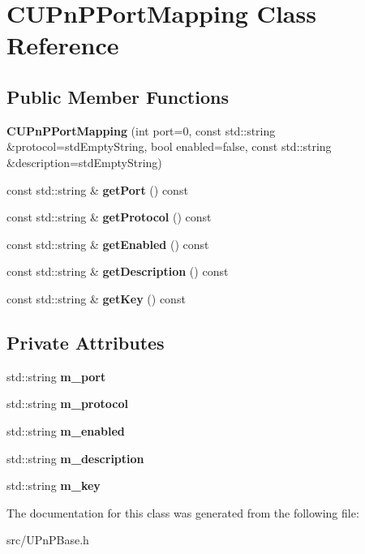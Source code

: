 \section{CUPnPPortMapping Class Reference}
\label{classCUPnPPortMapping}
\subsection*{Public Member Functions}
\begin{DoxyCompactItemize}
\item 
{\bfseries CUPnPPortMapping} (int port=0, const std::string \&protocol=stdEmptyString, bool enabled=false, const std::string \&description=stdEmptyString)\label{classCUPnPPortMapping_afcbde7763976517bf4fffbb1407b24dd}

\item 
const std::string \& {\bfseries getPort} () const \label{classCUPnPPortMapping_ac622bc5b73c61da7c3ac26dc28f39b00}

\item 
const std::string \& {\bfseries getProtocol} () const \label{classCUPnPPortMapping_a25115b3213941d62aff7507d8348dd65}

\item 
const std::string \& {\bfseries getEnabled} () const \label{classCUPnPPortMapping_a1d5b354da03b26a7121da14c7fbb6c48}

\item 
const std::string \& {\bfseries getDescription} () const \label{classCUPnPPortMapping_a8cf3a6287b6db08118101ed864be8004}

\item 
const std::string \& {\bfseries getKey} () const \label{classCUPnPPortMapping_a36a2327d205516a58ab3ce34b89c6ee0}

\end{DoxyCompactItemize}
\subsection*{Private Attributes}
\begin{DoxyCompactItemize}
\item 
std::string {\bfseries m\_\-port}\label{classCUPnPPortMapping_a861f4a72806974e9775d67c759f4b6ab}

\item 
std::string {\bfseries m\_\-protocol}\label{classCUPnPPortMapping_a5214e331168a0907387a0ecbf55baca5}

\item 
std::string {\bfseries m\_\-enabled}\label{classCUPnPPortMapping_a01ccf929ec6be1b07553da4a981e8efc}

\item 
std::string {\bfseries m\_\-description}\label{classCUPnPPortMapping_a040d7440447194ef98988fe37079ee82}

\item 
std::string {\bfseries m\_\-key}\label{classCUPnPPortMapping_a692fda01a4a5ad38ab164594c5ce9115}

\end{DoxyCompactItemize}


The documentation for this class was generated from the following file:\begin{DoxyCompactItemize}
\item 
src/UPnPBase.h\end{DoxyCompactItemize}
